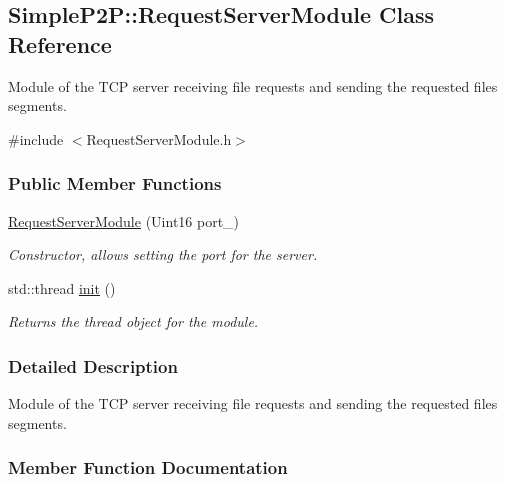 \hypertarget{classSimpleP2P_1_1RequestServerModule}{}\subsection{Simple\+P2P\+:\+:Request\+Server\+Module Class Reference}
\label{classSimpleP2P_1_1RequestServerModule}


Module of the T\+CP server receiving file requests and sending the requested files\textquotesingle{} segments.  




{\ttfamily \#include $<$Request\+Server\+Module.\+h$>$}

\subsubsection*{Public Member Functions}
\begin{DoxyCompactItemize}
\item 
\mbox{\label{classSimpleP2P_1_1RequestServerModule_af2338209b76cc5bdf26ea16ee7532579}} 
\hyperlink{classSimpleP2P_1_1RequestServerModule_af2338209b76cc5bdf26ea16ee7532579}{Request\+Server\+Module} (Uint16 port\+\_\+)
\begin{DoxyCompactList}\small\item\em Constructor, allows setting the port for the server. \end{DoxyCompactList}\item 
std\+::thread \hyperlink{classSimpleP2P_1_1RequestServerModule_aa8b342854453de8c7050062fdafbf6cd}{init} ()
\begin{DoxyCompactList}\small\item\em Returns the thread object for the module. \end{DoxyCompactList}\end{DoxyCompactItemize}


\subsubsection{Detailed Description}
Module of the T\+CP server receiving file requests and sending the requested files\textquotesingle{} segments. 

\subsubsection{Member Function Documentation}
\mbox{\label{classSimpleP2P_1_1RequestServerModule_aa8b342854453de8c7050062fdafbf6cd}} 

